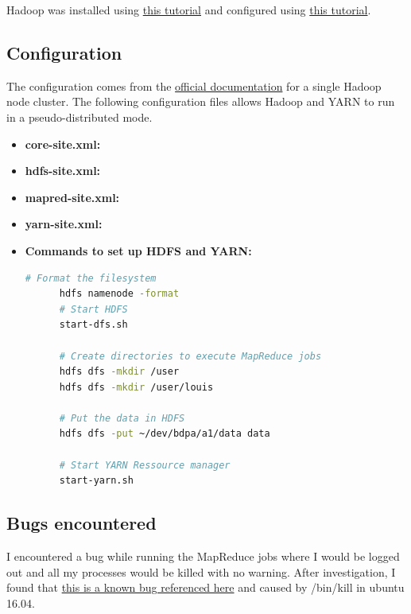 \documentclass[a4paper,10pt]{article}
\begin{document}
Hadoop was installed using \href{https://www.digitalocean.com/community/tutorials/how-to-install-hadoop-in-stand-alone-mode-on-ubuntu-16-04}{this tutorial} and configured using \href{https://hadoop.apache.org/docs/stable/hadoop-project-dist/hadoop-common/SingleCluster.html}{this tutorial}.


\subsection{Configuration}
The configuration comes from the \href{https://hadoop.apache.org/docs/stable/hadoop-project-dist/hadoop-common/SingleCluster.html}{official documentation} for a single Hadoop node cluster.
The following configuration files allows Hadoop and YARN to run in a pseudo-distributed mode.
\begin{itemize}
    \item \textbf{core-site.xml:}
    
    \item \textbf{hdfs-site.xml:}
    
    \item \textbf{mapred-site.xml:}
    
    \item \textbf{yarn-site.xml:}
    
    \item \textbf{Commands to set up HDFS and YARN:}
    \begin{lstlisting}[language=bash]
      # Format the filesystem
      hdfs namenode -format
      # Start HDFS
      start-dfs.sh

      # Create directories to execute MapReduce jobs
      hdfs dfs -mkdir /user
      hdfs dfs -mkdir /user/louis

      # Put the data in HDFS
      hdfs dfs -put ~/dev/bdpa/a1/data data

      # Start YARN Ressource manager
      start-yarn.sh
    \end{lstlisting}
\end{itemize}


\subsection{Bugs encountered}
I encountered a bug while running the MapReduce jobs where I would be logged out and all my processes would be killed with no warning.
After investigation, I found that \href{https://bugs.launchpad.net/ubuntu/+source/procps/+bug/1610499}{this is a known bug referenced here} and caused by /bin/kill in ubuntu 16.04.
\end{document}
